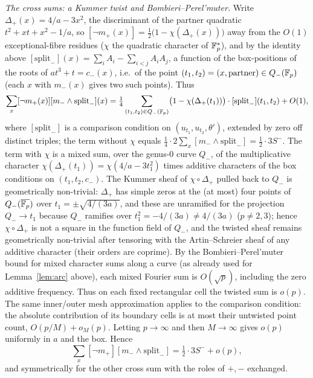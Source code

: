 \smallskip\noindent\emph{The cross sums: a Kummer twist and Bombieri--Perel'muter.} Write
$\Delta_+(x)=4/a-3x^2$, the discriminant of the partner quadratic $t^2+xt+x^2-1/a$, so $[\neg m_+(x)]=
\tfrac12\bigl(1-\chi(\Delta_+(x))\bigr)$ away from the $O(1)$ exceptional-fibre residues ($\chi$ the quadratic character of $\mathbb{F}_p^*$), and by
the identity above $[\mathrm{split}_-](x)=\sum_iA_i-\sum_{i<j}A_iA_j$, a function of the box-positions of the roots
of $at^3+t=c_-(x)$, i.e.\ of the point $(t_1,t_2)=(x,\text{partner})\in Q_-(\mathbb{F}_p)$ (each $x$ with $m_-(x)$ gives two such
points). Thus
\[
\sum_x[\neg m_+(x)][m_-\wedge\mathrm{split}_-](x)=\tfrac14\sum_{(t_1,t_2)\in Q_-(\mathbb{F}_p)}\bigl(1-\chi(\Delta_+(t_1))\bigr)\cdot[\mathrm{split}_-](t_1,t_2)+O(1),
\]
where $[\mathrm{split}_-]$ is a comparison condition on $(u_{t_1},u_{t_2},\theta')$, extended by zero off distinct triples; the term without $\chi$ equals
$\tfrac14\cdot2\sum_x[m_-\wedge\mathrm{split}_-]=\tfrac12\cdot3S^-$. The term with $\chi$ is a mixed sum, over the genus-$0$ curve $Q_-$, of the
multiplicative character $\chi(\Delta_+(t_1))=\chi(4/a-3t_1^2)$ times additive characters of the box conditions on
$(t_1,t_2,c_-)$. The Kummer sheaf of $\chi\circ\Delta_+$ pulled back to $Q_-$ is geometrically non-trivial: $\Delta_+$
has simple zeros at the (at most) four points of $Q_-(\overline{\mathbb{F}_p})$ over $t_1=\pm\sqrt{4/(3a)}$, and these are
unramified for the projection $Q_-\to t_1$ because $Q_-$ ramifies over $t_1^2=-4/(3a)\ne4/(3a)$ ($p\ne2,3$); hence
$\chi\circ\Delta_+$ is not a square in the function field of $Q_-$, and the twisted sheaf remains geometrically
non-trivial after tensoring with the Artin--Schreier sheaf of any additive character (their orders are coprime).
By the Bombieri--Perel'muter bound for mixed character sums along a curve \cite{Perelmuter} (as already used for
Lemma~\ref{lem:arc} above), each mixed Fourier sum is $O(\sqrt p)$, including the zero additive frequency.
Thus on each fixed rectangular cell the twisted sum is $o(p)$.  The same inner/outer mesh approximation applies to the comparison condition:
the absolute contribution of its boundary cells is at most their untwisted point count, $O(p/M)+o_M(p)$.
Letting $p\to\infty$ and then $M\to\infty$ gives $o(p)$ uniformly in $a$ and the box. Hence
\[
\sum_x[\neg m_+][m_-\wedge\mathrm{split}_-]=\tfrac12\cdot3S^-+o(p),
\]
and symmetrically for the other cross sum with the roles of $+,-$ exchanged.


